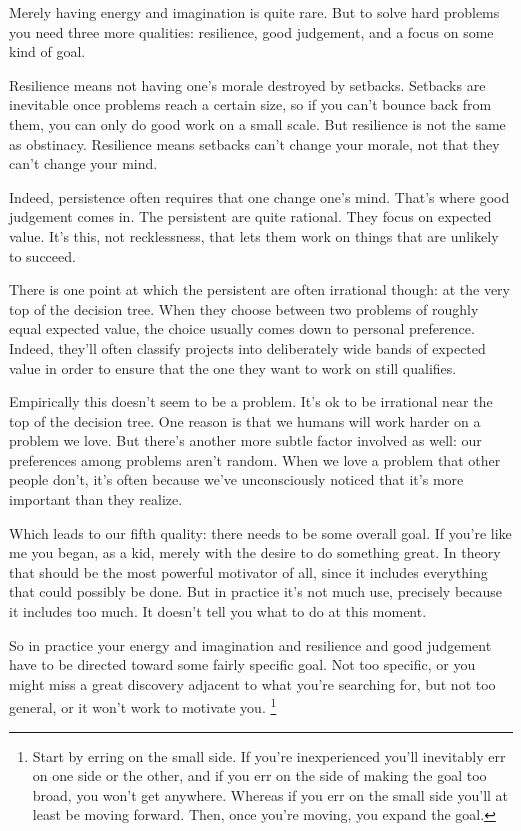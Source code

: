 \documentclass[12pt]{book}
\begin{document}
Merely having energy and imagination is quite rare. But to solve hard
problems you need three more qualities: resilience, good judgement, and
a focus on some kind of goal.

Resilience means not having one's morale destroyed by setbacks. Setbacks
are inevitable once problems reach a certain size, so if you can't
bounce back from them, you can only do good work on a small scale. But
resilience is not the same as obstinacy. Resilience means setbacks can't
change your morale, not that they can't change your mind.

Indeed, persistence often requires that one change one's mind. That's
where good judgement comes in. The persistent are quite rational. They
focus on expected value. It's this, not recklessness, that lets them
work on things that are unlikely to succeed.

There is one point at which the persistent are often irrational though:
at the very top of the decision tree. When they choose between two
problems of roughly equal expected value, the choice usually comes down
to personal preference. Indeed, they'll often classify projects into
deliberately wide bands of expected value in order to ensure that the
one they want to work on still qualifies.

Empirically this doesn't seem to be a problem. It's ok to be irrational
near the top of the decision tree. One reason is that we humans will
work harder on a problem we love. But there's another more subtle factor
involved as well: our preferences among problems aren't random. When we
love a problem that other people don't, it's often because we've
unconsciously noticed that it's more important than they realize.

Which leads to our fifth quality: there needs to be some overall goal.
If you're like me you began, as a kid, merely with the desire to do
something great. In theory that should be the most powerful motivator of
all, since it includes everything that could possibly be done. But in
practice it's not much use, precisely because it includes too much. It
doesn't tell you what to do at this moment.

So in practice your energy and imagination and resilience and good
judgement have to be directed toward some fairly specific goal. Not too
specific, or you might miss a great discovery adjacent to what you're
searching for, but not too general, or it won't work to motivate you.
\footnote{Start by erring on the small side. If you're inexperienced
you'll inevitably err on one side or the other, and if you err on the
side of making the goal too broad, you won't get anywhere. Whereas if
you err on the small side you'll at least be moving forward. Then, once
you're moving, you expand the goal.}
\end{document}
